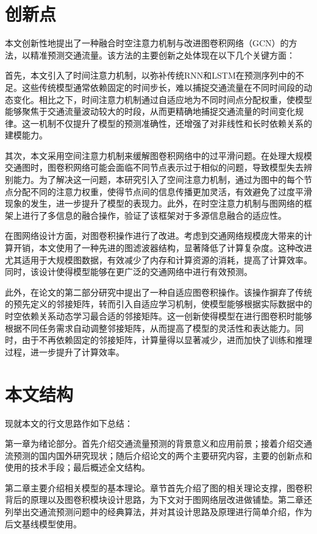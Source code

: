 \section{创新点}

本文创新性地提出了一种融合时空注意力机制与改进图卷积网络（GCN）的方法，以精准预测交通流量。该方法的主要创新之处体现在以下几个关键方面：

首先，本文引入了时间注意力机制，以弥补传统RNN和LSTM在预测序列中的不足。这些传统模型通常依赖固定的时间步长，难以捕捉交通流量在不同时间段的动态变化。相比之下，时间注意力机制通过自适应地为不同时间点分配权重，使模型能够聚焦于交通流量波动较大的时段，从而更精确地捕捉交通流量的时间变化规律。这一机制不仅提升了模型的预测准确性，还增强了对非线性和长时依赖关系的建模能力。

其次，本文采用空间注意力机制来缓解图卷积网络中的过平滑问题。在处理大规模交通图时，图卷积网络可能会面临不同节点表示过于相似的问题，导致模型失去辨别能力。为了解决这一问题，本研究引入了空间注意力机制，通过为图中的每个节点分配不同的注意力权重，使得节点间的信息传播更加灵活，有效避免了过度平滑现象的发生，进一步提升了模型的表现力。此外，在时空注意力机制与图网络的框架上进行了多信息的融合操作，验证了该框架对于多源信息融合的适应性。

在图网络设计方面，对图卷积操作进行了改进。考虑到交通网络规模庞大带来的计算开销，本文使用了一种先进的图滤波器结构，显著降低了计算复杂度。这种改进尤其适用于大规模图数据，有效减少了内存和计算资源的消耗，提高了计算效率。同时，该设计使得模型能够在更广泛的交通网络中进行有效预测。

此外，在论文的第二部分研究中提出了一种自适应图卷积操作。该操作摒弃了传统的预先定义的邻接矩阵，转而引入自适应学习机制，使模型能够根据实际数据中的时空依赖关系动态学习最合适的邻接矩阵。这一创新使得模型在进行图卷积时能够根据不同任务需求自动调整邻接矩阵，从而提高了模型的灵活性和表达能力。同时，由于不再依赖固定的邻接矩阵，计算量得以显著减少，进而加快了训练和推理过程，进一步提升了计算效率。



\section{本文结构}
现就本文的行文思路作如下总结： 

第一章为绪论部分。首先介绍交通流量预测的背景意义和应用前景；接着介绍交通流预测的国内国外研究现状；随后介绍论文的两个主要研究内容，主要的创新点和使用的技术手段；最后概述全文结构。 

第二章主要介绍相关模型的基本理论。章节首先介绍了图的相关理论支撑，图卷积背后的原理以及图卷积模块设计思路，为下文对于图网络层改进做铺垫。第二章还列举出交通流预测问题中的经典算法，并对其设计思路及原理进行简单介绍，作为后文基线模型使用。

